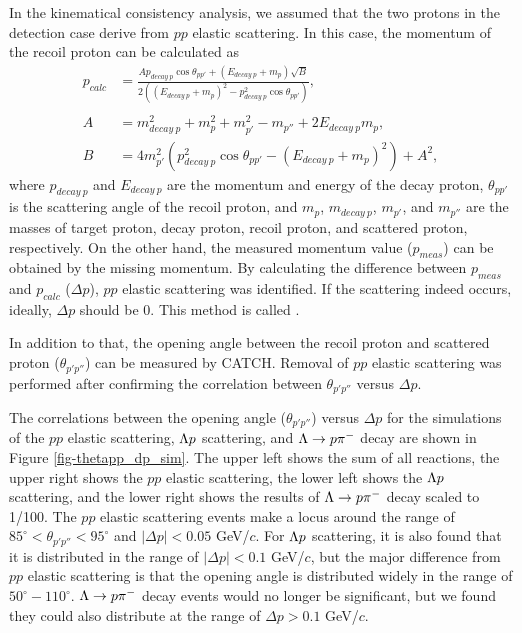 In the kinematical consistency analysis, we assumed that the two protons in the detection case  derive from $pp$ elastic scattering. In this case, the momentum of the recoil proton can be calculated as
\begin{align}
  p_{calc} &= \frac{A p_{decay\ p} \cos{\theta_{pp'}} + (E_{decay\ p} + m_{p}) \sqrt{B}}{2((E_{decay\ p} + m_{p})^{2} - p^{2}_{decay\ p} \cos{\theta_{pp'}})}, \\
  \nonumber \\
  A &= m^{2}_{decay\ p} + m^{2}_{p} + m^{2}_{p'} - m_{p''} + 2 E_{decay\ p} m_{p}, \\
  B &= 4 m^{2}_{p'} ( p^{2}_{decay\ p} \cos{\theta_{pp'}} - (E_{decay\ p} + m_{p})^{2} ) + A^{2},
\end{align}
where $p_{decay\ p}$ and $E_{decay\ p}$ are the momentum and energy of the decay proton, $\theta_{pp'}$ is the scattering angle of the recoil proton, and $m_{p}$, $m_{decay\ p}$, $m_{p'}$, and $m_{p''}$ are the masses of target proton, decay proton, recoil proton, and scattered proton, respectively. On the other hand, the measured momentum value ($p_{meas}$) can be obtained by the missing momentum. 
By calculating the difference between $p_{meas}$ and $p_{calc}$ ($\Delta p$), $pp$ elastic scattering was identified. If the scattering indeed occurs, ideally, $\Delta p$ should be 0. This method is called . 

In addition to that, the opening angle between the recoil proton and scattered proton ($\theta_{p'p''}$) can be measured by CATCH. Removal of $pp$ elastic scattering was performed after confirming the correlation between $\theta_{p'p''}$ versus $\Delta p$.

The correlations between the opening angle ($\theta_{p'p''}$) versus $\Delta p$ for the simulations of the $pp$ elastic scattering, $\Lambda p$ scattering, and $\Lambda\to p\pi^{-}$ decay are shown in Figure \ref{fig-thetapp_dp_sim}. The upper left shows the sum of all reactions, the upper right shows the $pp$ elastic scattering, the lower left shows the $\Lambda p$ scattering, and the lower right shows the results of $\Lambda\to p\pi^{-}$ decay scaled to 1/100. The $pp$ elastic scattering events make a locus around the range of $85^{\circ}<\theta_{p'p''}<95^{\circ}$ and $|\Delta p|<0.05$ GeV/$c$. For $\Lambda p$ scattering, it is also found that it is distributed in the range of $|\Delta p|<0.1$ GeV/$c$, but the major difference from $pp$ elastic scattering is that the opening angle is distributed widely in the range of $50^{\circ}-110^{\circ}$. $\Lambda\to p\pi^{-}$ decay events would no longer be significant, but we found they could also distribute at the range of $\Delta p>0.1$ GeV/$c$. 

